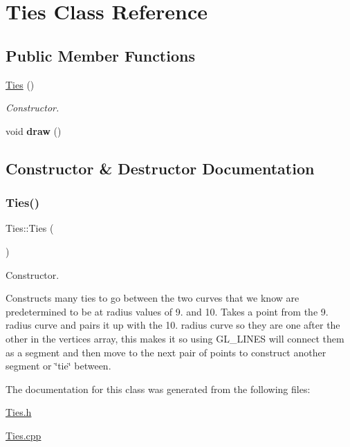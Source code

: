 \hypertarget{class_ties}{}\section{Ties Class Reference}
\label{class_ties}
\subsection*{Public Member Functions}
\begin{DoxyCompactItemize}
\item 
\hyperlink{class_ties_aa4b20c893a61f27a6027c54d20540115}{Ties} ()
\begin{DoxyCompactList}\small\item\em Constructor. \end{DoxyCompactList}\item 
\mbox{\label{class_ties_a7e5e28a90cc1d610e405028aa3d2ef8f}} 
void {\bfseries draw} ()
\end{DoxyCompactItemize}


\subsection{Constructor \& Destructor Documentation}
\mbox{\label{class_ties_aa4b20c893a61f27a6027c54d20540115}} 
\subsubsection{\texorpdfstring{Ties()}{Ties()}}
{\footnotesize\ttfamily Ties\+::\+Ties (\begin{DoxyParamCaption}{ }\end{DoxyParamCaption})}



Constructor. 

Constructs many ties to go between the two curves that we know are predetermined to be at radius values of 9. and 10. Takes a point from the 9. radius curve and pairs it up with the 10. radius curve so they are one after the other in the vertices array, this makes it so using G\+L\+\_\+\+L\+I\+N\+ES will connect them as a segment and then move to the next pair of points to construct another segment or \char`\"{}tie\char`\"{} between. 

The documentation for this class was generated from the following files\+:\begin{DoxyCompactItemize}
\item 
\hyperlink{_ties_8h}{Ties.\+h}\item 
\hyperlink{_ties_8cpp}{Ties.\+cpp}\end{DoxyCompactItemize}
